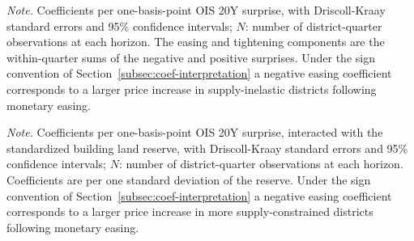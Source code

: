 \documentclass[a4paper,12pt, headsepline]{scrartcl}
\newcommand{\figcap}[2]{\caption[#1]{\textbf{#1}\newline #2}}
\numberwithin{equation}{section}
\begin{document}
\begin{table}[H]
	\centering
	\figcap{Asymmetric specification (AS2), binary classification, coefficients}{Estimated easing and tightening interaction coefficients per horizon $h$.}\label{tab:raw-asymmetric-binary}
	

	\vspace{0.2cm}
	\begin{minipage}{0.9\textwidth}
		\footnotesize
		\textit{Note.} Coefficients per one-basis-point OIS 20Y surprise, with Driscoll-Kraay standard errors and 95\% confidence intervals; $N$: number of district-quarter observations at each horizon. The easing and tightening components are the within-quarter sums of the negative and positive surprises. Under the sign convention of Section~\ref{subsec:coef-interpretation} a negative easing coefficient corresponds to a larger price increase in supply-inelastic districts following monetary easing.
	\end{minipage}
\end{table}

\begin{table}[H]
	\centering
	\figcap{Asymmetric specification (AS2), continuous reserve, coefficients}{Estimated easing and tightening interaction coefficients per horizon $h$.}\label{tab:raw-asymmetric-continuous}
	

	\vspace{0.2cm}
	\begin{minipage}{0.9\textwidth}
		\footnotesize
		\textit{Note.} Coefficients per one-basis-point OIS 20Y surprise, interacted with the standardized building land reserve, with Driscoll-Kraay standard errors and 95\% confidence intervals; $N$: number of district-quarter observations at each horizon. Coefficients are per one standard deviation of the reserve. Under the sign convention of Section~\ref{subsec:coef-interpretation} a negative easing coefficient corresponds to a larger price increase in more supply-constrained districts following monetary easing.
	\end{minipage}
\end{table}
\end{document}
